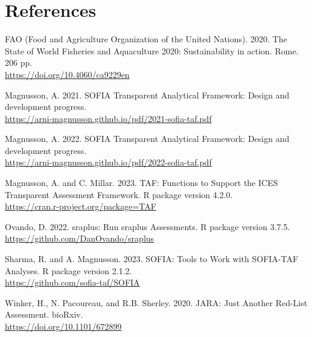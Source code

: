 \documentclass[12pt]{article}
\newcommand\blue[1]{\textcolor{darkblue}{#1}}
\begin{document}
\vspace{3ex}

\section{References}

\small\sloppy\setlength{}\selectfont
\begin{description}\setlength\itemsep{0.5ex}\vspace{0.5ex}

  \item FAO (Food and Agriculture Organization of the United Nations). 2020. The
  State of World Fisheries and Aquaculture 2020: Sustainability in action. Rome.
  206 pp.\\
  \blue{\footnotesize\url{https://doi.org/10.4060/ca9229en}}

  \item Magnusson, A. 2021. SOFIA Transparent Analytical Framework: Design and
  development progress.\\
  \blue{%
    \footnotesize\url{https://arni-magnusson.github.io/pdf/2021-sofia-taf.pdf}}

  \item Magnusson, A. 2022. SOFIA Transparent Analytical Framework: Design and
  development progress.\\
  \blue{%
    \footnotesize\url{https://arni-magnusson.github.io/pdf/2022-sofia-taf.pdf}}

  \item Magnusson, A. and C. Millar. 2023. TAF: Functions to Support the ICES
  Transparent Assessment Framework. R package version 4.2.0.\\
  \blue{\footnotesize\url{https://cran.r-project.org/package=TAF}}

  \item Ovando, D. 2022. sraplus: Run sraplus Assessments. R package version
  3.7.5.\\
  \blue{\footnotesize\url{https://github.com/DanOvando/sraplus}}

  \item Sharma, R. and A. Magnusson. 2023. SOFIA: Tools to Work with SOFIA-TAF
  Analyses. R package version 2.1.2.\\
  \blue{\footnotesize\url{https://github.com/sofia-taf/SOFIA}}

  \item Winker, H., N. Pacoureau, and R.B. Sherley. 2020. JARA: Just Another
  Red-List Assessment. bioRxiv.\\
  \blue{\footnotesize\url{https://doi.org/10.1101/672899}}

\end{description}
\end{document}
